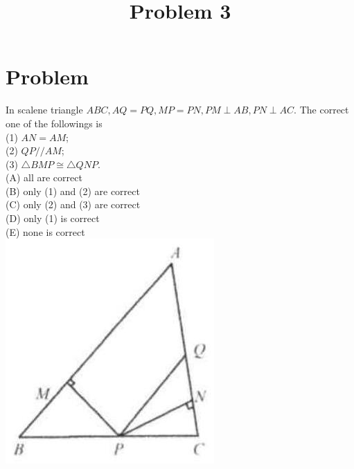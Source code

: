 \documentclass{article}
\title{Problem 3}
\date{}
\begin{document}
\maketitle

\section*{Problem}
In scalene triangle \(A B C, A Q=P Q, M P=P N, P M \perp A B, P N \perp A C\). The correct one of the followings is\\
(1) \(A N=A M\);\\
(2) \(Q P / / A M\);\\
(3) \(\triangle B M P \cong \triangle Q N P\).\\
(A) all are correct\\
(B) only (1) and (2) are correct\\
(C) only (2) and (3) are correct\\
(D) only (1) is correct\\
(E) none is correct\\
\centering
\includegraphics[width=\textwidth]{images/problem_image_1.jpg}
\end{document}
